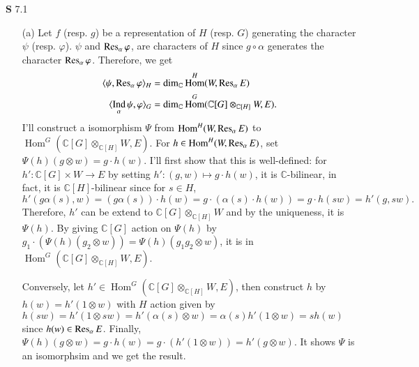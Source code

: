 \documentclass[a4paper, 12pt]{article}
\theoremstyle{Mydefinition}
\theoremstyle{Mytheorem}
\DeclareMathOperator{\Ind}{Ind}
\DeclareMathOperator{\Hom}{Hom}
\begin{document}
\noindent \textbf{S} 7.1
\begin{enumerate}
    \item[(a)]Let $f$ (resp. $g$) be a representation of $H$ (resp. $G$) generating the character $\psi$ (resp. $\varphi$). $\psi$ and $\Res_\alpha \varphi$, are characters of $H$ since $g\circ \alpha$ generates the character $\Res_\alpha \varphi$. Therefore, we get
\begin{equation}
    \begin{split}
        \langle \psi, \Res_\alpha \varphi\rangle_H &= \dim_\mathbb{C} \Hom^H(W,\Res_\alpha E)\\
        \langle \Ind_\alpha\psi,  \varphi\rangle_G &= \dim_\mathbb{C} \Hom^G(\mathbb{C}[G]\otimes_{\mathbb{C}[H]}W, E).
    \end{split}
\end{equation}
I'll construct a isomorphism $\Psi$ from $\Hom^H(W,\Res_\alpha E)$ to $\Hom^G(\mathbb{C}[G]\otimes_{\mathbb{C}[H]}W, E)$. For $h\in \Hom^H(W,\Res_\alpha E)$, set $\Psi(h)(g\otimes w) = g\cdot h(w)$. I'll first show that this is well-defined: for $h':\mathbb{C}[G]\times W\rightarrow E$ by setting $h':(g, w)\mapsto g\cdot h(w)$, it is $\mathbb{C}$-bilinear, in fact, it is $\mathbb{C}[H]$-bilinear since for $s\in H$,
\begin{equation}
    h'(g\alpha(s), w) = (g\alpha(s))\cdot h(w) = g\cdot(\alpha(s)\cdot h(w)) = g\cdot h(sw) = h'(g, sw).
\end{equation}
Therefore, $h'$ can be extend to $\mathbb{C}[G]\otimes_{\mathbb{C}[H]}W$ and by the uniqueness, it is $\Psi(h)$. By giving $\mathbb{C}[G]$ action on $\Psi(h)$ by $g_1\cdot \left(\Psi(h)(g_2\otimes w)\right) = \Psi(h)(g_1g_2\otimes w)$, it is in $\Hom^G(\mathbb{C}[G]\otimes_{\mathbb{C}[H]}W, E)$.

Conversely, let $h'\in \Hom^G(\mathbb{C}[G]\otimes_{\mathbb{C}[H]}W, E)$, then construct $h$ by $h(w) = h'(1\otimes w)$ with $H$ action given by $h(sw) = h'(1\otimes sw) = h'(\alpha(s)\otimes w) = \alpha(s)h'(1\otimes w) = sh(w)$ since $h(w)\in \Res_\alpha E$. Finally, $\Psi(h)(g\otimes w) = g\cdot h(w) = g\cdot \left(h'(1\otimes w)\right) = h'(g\otimes w)$. It shows $\Psi$ is an isomorphsim and we get the result.


\end{enumerate}
\end{document}
